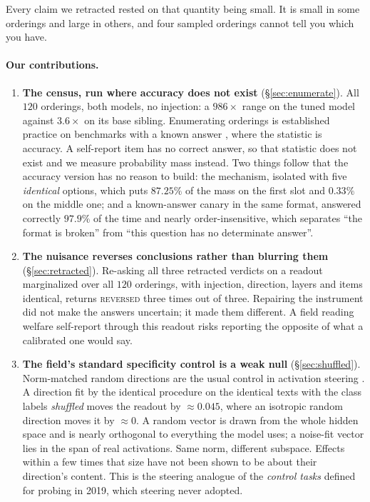 \documentclass{article}
\begin{document}
Every claim we retracted rested on that quantity being small. It is small in some orderings and
large in others, and four sampled orderings cannot tell you which you have.

\paragraph{Our contributions.}
\begin{enumerate}
\item \textbf{The census, run where accuracy does not exist} (\S\ref{sec:enumerate}). All $120$
orderings, both models, no injection: a $986\times$ range on the tuned model against $3.6\times$ on
its base sibling. Enumerating orderings is established practice on benchmarks with a known answer
\citep{tamba2026, cacioli2026}, where the statistic is accuracy. A self-report item has no correct
answer, so that statistic does not exist and we measure probability mass instead. Two things follow
that the accuracy version has no reason to build: the mechanism, isolated with five \emph{identical}
options, which puts $87.25\%$ of the mass on the first slot and $0.33\%$ on the middle one; and a
known-answer canary in the same format, answered correctly $97.9\%$ of the time and nearly
order-insensitive, which separates ``the format is broken'' from ``this question has no determinate
answer''.

\item \textbf{The nuisance reverses conclusions rather than blurring them}
(\S\ref{sec:retracted}). Re-asking all three retracted verdicts on a readout marginalized over all
$120$ orderings, with injection, direction, layers and items identical, returns \textsc{reversed}
three times out of three. Repairing the instrument did not make the answers uncertain; it made them
different. A field reading welfare self-report through this readout risks reporting the opposite of
what a calibrated one would say.

\item \textbf{The field's standard specificity control is a weak null} (\S\ref{sec:shuffled}).
Norm-matched random directions are the usual control in activation steering \citep{turner2023,
rimsky2023}. A direction fit by the identical procedure on the identical texts with the class labels
\emph{shuffled} moves the readout by $\approx 0.045$, where an isotropic random direction moves it
by $\approx 0$. A random vector is drawn from the whole hidden space and is nearly orthogonal to
everything the model uses; a noise-fit vector lies in the span of real activations. Same norm,
different subspace. Effects within a few times that size have not been shown to be about their
direction's content. This is the steering analogue of the \emph{control tasks} \citet{hewitt2019}
defined for probing in 2019, which steering never adopted.


\end{enumerate}
\end{document}
